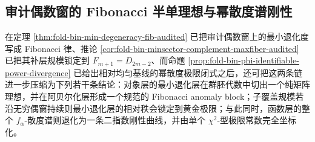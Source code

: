 \subsection{审计偶数窗的 Fibonacci 半单理想与幂散度谱刚性}\label{subsec:conclusion-foldbin-minideal-powerdivergence-fibonacci-rigidity}
在定理 \ref{thm:fold-bin-min-degeneracy-fib-audited} 已把审计偶数窗上的最小退化度写成 Fibonacci 律、推论 \ref{cor:fold-bin-minsector-complement-maxfiber-audited} 已把其补层规模锁定到 \(F_{m+1}=D_{2m-2}\)、而命题 \ref{prop:fold-bin-phi-identifiable-power-divergence} 已给出相对均匀基线的幂散度极限闭式之后，还可把这两条链进一步压缩为下列若干条结论：对象层的最小退化层在群胚代数中切出一个纯矩阵理想，并在阿贝尔化层形成一个规范的 Fibonacci anomaly block；子覆盖规模若沿无穷偶窗持续则最小退化层的相对秩会锁定到黄金极限；与此同时，函数层的整个 \(f_\alpha\)-散度谱则退化为一条二指数刚性曲线，并由单个 \(\chi^2\)-型极限常数完全坐标化。

